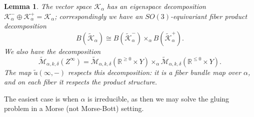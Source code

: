 \documentclass{memo-l}
\newtheorem{lemma}[theorem]{Lemma}
\theoremstyle{definition}
\theoremstyle{remark}
\numberwithin{section}{chapter}
\numberwithin{equation}{chapter}
\begin{document}
\begin{lemma}
The vector space $\mathcal K_\alpha$ has an eigenspace decomposition $\mathcal K^-_\alpha \oplus \mathcal K^+_\alpha = \mathcal K_\alpha$; correspondingly we have an $SO(3)$-equivariant fiber product decomposition $$B(\widetilde{\mathcal K}_\alpha) \cong B(\widetilde{\mathcal K}^-_\alpha) \times_{\alpha} B(\widetilde{\mathcal K}^+_\alpha).$$ We also have the decomposition $$\widetilde{\mathcal M}_{\alpha, k, \delta}(Z^\infty) = \widetilde{\mathcal M}_{\alpha, k, \delta}(\mathbb R^{\geq 0} \times Y) \times_\alpha \widetilde{\mathcal M}_{\alpha, k, \delta}(\mathbb R^{\leq 0} \times Y).$$ The map $\widetilde u(\infty, -)$ respects this decomposition: it is a fiber bundle map over $\alpha$, and on each fiber it respects the product structure.
\end{lemma}

The easiest case is when $\alpha$ is irreducible, as then we may solve the gluing problem in a Morse (not Morse-Bott) setting.
\end{document}
